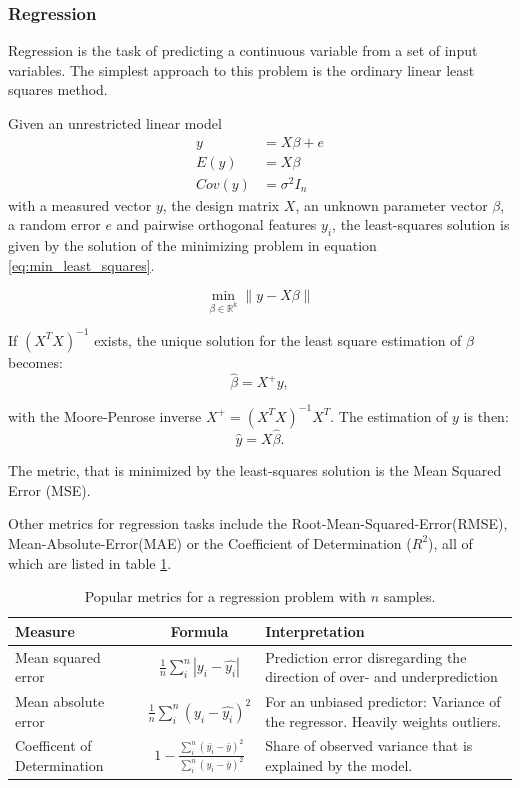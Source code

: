 \subsubsection{Regression}
Regression is the task of predicting a continuous variable
from a set of input variables.
The simplest approach
to this problem is the ordinary linear least squares method.

Given an unrestricted linear model
\begin{align}
	y &= X\beta + e \\
	E(y) &= X\beta \\
	Cov(y) &= \sigma^2 I_n
\end{align}
with a measured vector $y$, the design matrix $X$,
an unknown parameter vector $\beta$, a random error $e$
and pairwise orthogonal features $y_i$,
the least-squares solution is given by the solution of
the minimizing problem in equation \ref{eq:min_least_squares}.

\begin{equation}
	\min_{\beta\in\mathbb{R}^k} \lVert y - X\beta \rVert
	\label{eq:min_least_squares}
\end{equation}

If $(X^TX)^{-1}$ exists, the unique solution for the
least square estimation of $\beta$ becomes:
\begin{equation}
	\hat{\beta} = X^+ y,
\end{equation}

with the Moore-Penrose inverse $X^+ = (X^TX)^{-1}X^T$.
The estimation of $y$ is then:
\begin{equation}
  \hat{y} = X\hat{\beta}.
\end{equation}

The metric, that is minimized by the least-squares solution
is the Mean Squared Error (MSE).

Other metrics for regression tasks include the
Root-Mean-Squared-Error(RMSE),
Mean-Absolute-Error(MAE)
or the Coefficient of Determination ($R^2$), all of which are listed in table
\ref{tab:regr_metrics}.

\begin{table}
  \caption{Popular metrics for a regression problem with $n$ samples.}
  \begin{center}
    \begin{tabularx}{\textwidth}{l c X}
      Measure & Formula & Interpretation \\
      \hline
      Mean squared error & $\frac{1}{n}\sum_i^n |y_i-\hat{y_i}|$ & Prediction error disregarding the direction of over- and underprediction \\
      Mean absolute error & $\frac{1}{n}\sum_i^n (y_i-\hat{y_i})^2$ & For an unbiased predictor: Variance of the regressor. Heavily weights outliers. \\
      Coefficent of Determination & $1 - \frac{\sum_i^n (\bar{y_i}-\bar{y})^2}{\sum_i^n (y_i-\bar{y})^2}$ & Share of observed variance that is explained by the model.\\
    \end{tabularx}
  \end{center}
  \label{tab:regr_metrics}
\end{table}

